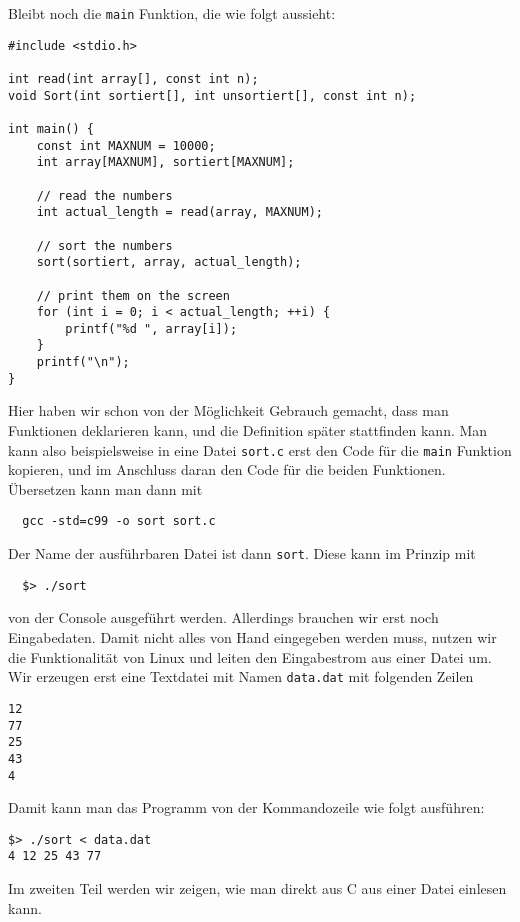 Bleibt noch die \verb|main| Funktion, die wie folgt aussieht:
\begin{lstlisting}
#include <stdio.h>

int read(int array[], const int n);
void Sort(int sortiert[], int unsortiert[], const int n);

int main() {
    const int MAXNUM = 10000;
    int array[MAXNUM], sortiert[MAXNUM];

    // read the numbers
    int actual_length = read(array, MAXNUM);

    // sort the numbers
    sort(sortiert, array, actual_length);

    // print them on the screen
    for (int i = 0; i < actual_length; ++i) {
        printf("%d ", array[i]);
    }
    printf("\n");
}
\end{lstlisting}
Hier haben wir schon von der Möglichkeit Gebrauch gemacht, dass man Funktionen deklarieren kann, und die Definition später stattfinden kann.
Man kann also beispielsweise in eine Datei \verb|sort.c| erst den Code für die \verb|main| Funktion kopieren, und im Anschluss daran den Code für die beiden Funktionen.
Übersetzen kann man dann mit
\begin{verbatim}
  gcc -std=c99 -o sort sort.c
\end{verbatim}
Der Name der ausführbaren Datei ist dann \verb|sort|.
Diese kann im Prinzip mit 
\begin{verbatim}                                                                                                    
  $> ./sort
\end{verbatim}
von der Console ausgeführt werden.
Allerdings brauchen wir erst noch Eingabedaten.
Damit nicht alles von Hand eingegeben werden muss, nutzen wir die Funktionalität von Linux und leiten den Eingabestrom aus einer Datei um.
Wir erzeugen erst eine Textdatei mit Namen \verb|data.dat| mit folgenden Zeilen
\begin{lstlisting}
12
77
25
43
4
\end{lstlisting}
Damit kann man das Programm von der Kommandozeile wie folgt ausführen:
\begin{verbatim}
$> ./sort < data.dat
4 12 25 43 77
\end{verbatim}
Im zweiten Teil werden wir zeigen, wie man direkt aus C aus einer Datei einlesen kann.

\endinput
